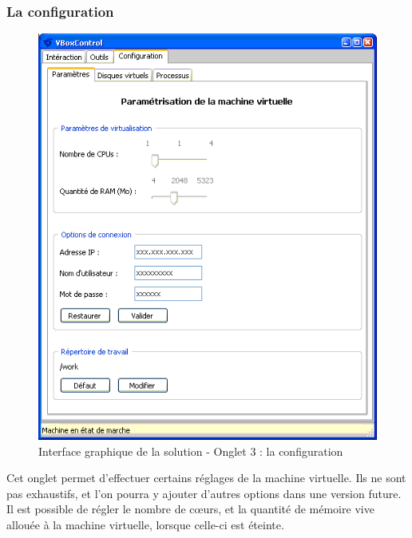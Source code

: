 
\subsubsection{La configuration}

\begin{figure}[!h]
	\center
	\includegraphics[scale=0.6]{img/Interface_solution_3.png}
	\caption{Interface graphique de la solution - Onglet 3 : la configuration}
	\label{Interface graphique de la solution - Onglet 3 : la configuration}
\end{figure}


Cet onglet permet d'effectuer certains réglages de la machine virtuelle.
Ils ne sont pas exhaustifs, et l'on pourra y ajouter d'autres options dans une version future.
\\

Il est possible de régler le nombre de cœurs, et la quantité de mémoire vive allouée à la machine virtuelle, lorsque celle-ci est éteinte.

